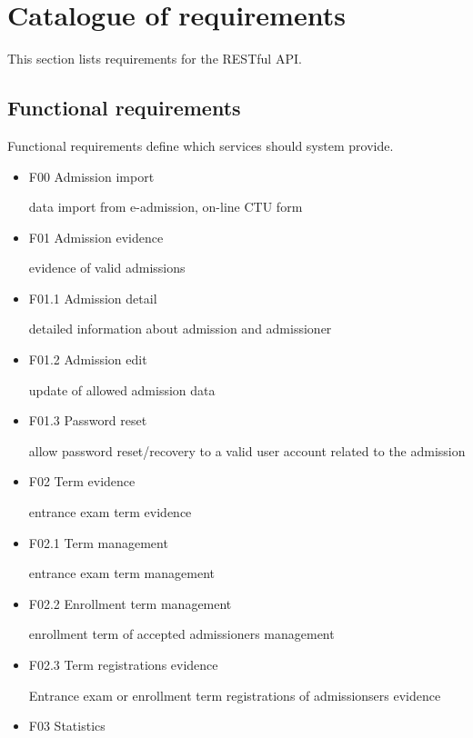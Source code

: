 	\section{Catalogue of requirements}
	
	This section lists requirements for the RESTful API. 
	
	\subsection{Functional requirements}
	
	Functional requirements define which services should system provide. 
	\begin{itemize}
		\item F00 Admission import
	
		data import from e-admission, on-line CTU form
		
		\item F01 Admission evidence
	
		evidence of valid admissions
		
		\item F01.1 Admission detail
		
		detailed information about admission and admissioner
		
		\item F01.2 Admission edit
		
		update of allowed admission data
		
		\item F01.3 Password reset
		
		allow password reset/recovery to a valid user account related to the admission
	
		\item F02 Term evidence
	
		entrance exam term evidence
		
		\item F02.1 Term management
		
		entrance exam term management
		
		\item F02.2 Enrollment term management
	
		enrollment term of accepted admissioners management
		
		\item F02.3 Term registrations evidence
	
		Entrance exam or enrollment term registrations of admissionsers evidence
	
		\item F03 Statistics
	

\end{itemize}
